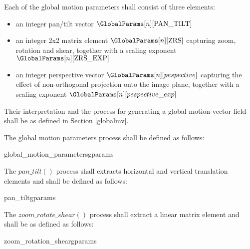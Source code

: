 Each of the global motion parameters shall consist of three elements: 

\begin{itemize}
\item an integer pan/tilt vector $\GlobalParams[n][\PanTilt]$
\item an integer 2x2 matrix element $\GlobalParams[n][\ZRS]$
capturing zoom, rotation and shear, together with a scaling exponent 
$\GlobalParams[n][\ZRSexponent]$
\item an integer perspective vector $\GlobalParams[n][pespective]$
capturing the effect of non-orthogonal projection onto the image plane, together 
with a scaling exponent $\GlobalParams[n][pespective\_exp]$
\end{itemize}

Their interpretation and the process for generating a global motion vector field 
shall be as defined in Section \ref{globalmv}. 

The global motion parameters process shall be defined as follows:

\begin{pseudo}{global\_motion\_parameters}{gparams}
\end{pseudo}

The $pan\_tilt()$ process shall extracts horizontal and vertical translation elements
and shall be defined as follows:

\begin{pseudo}{pan\_tilt}{gparams}
\bsEND
\end{pseudo}

The $zoom\_rotate\_shear()$ process shall extract a linear matrix element and shall be
as defined as follows:

\begin{pseudo}{zoom\_rotation\_shear}{gparams}
\bsELSE
\bsEND
\end{pseudo}

